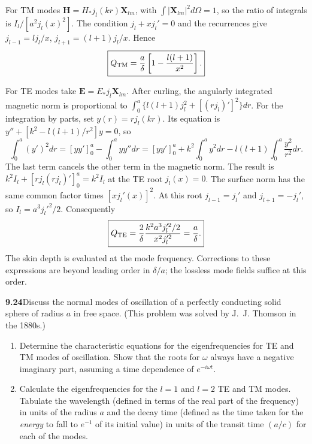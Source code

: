 For TM modes $\mathbf H=H_*j_l(kr)\mathbf X_{lm}$, with
$\int|\mathbf X_{lm}|^2d\Omega=1$, so the ratio of integrals is
$I_l/[a^2j_l(x)^2]$. The condition $j_l+xj_l'=0$ and the recurrences give
$j_{l-1}=lj_l/x$, $j_{l+1}=(l+1)j_l/x$. Hence
\[
\boxed{Q_{\rm TM}=\frac a\delta
\left[1-\frac{l(l+1)}{x^2}\right].}
\]

For TE modes take $\mathbf E=E_*j_l\mathbf X_{lm}$.
After curling, the angularly integrated magnetic norm is proportional to
$\int_0^a\{l(l+1)j_l^2+[(rj_l)']^2\}dr$.
For the integration by parts, set $y(r)=rj_l(kr)$. Its equation is
$y''+[k^2-l(l+1)/r^2]y=0$, so
\[
\int_0^a(y')^2dr=[yy']_0^a-\int_0^a yy''dr
=[yy']_0^a+k^2\int_0^a y^2dr
-l(l+1)\int_0^a\frac{y^2}{r^2}dr.
\]
The last term cancels the other term in the magnetic norm. The result is
$k^2I_l+[rj_l(rj_l)']_0^a=k^2I_l$ at the TE root $j_l(x)=0$.
The surface norm has the same common factor times $[xj_l'(x)]^2$.
At this root $j_{l-1}=j_l'$ and $j_{l+1}=-j_l'$, so
$I_l=a^3j_l'^2/2$. Consequently
\[
\boxed{Q_{\rm TE}=\frac2\delta
\frac{k^2a^3j_l'^2/2}{x^2j_l'^2}=\frac a\delta.}
\]
The skin depth is evaluated at the mode frequency. Corrections to these
expressions are beyond leading order in $\delta/a$; the lossless mode
fields suffice at this order.

\par\bigskip
\noindent\textbf{9.24}\quad Discuss the normal modes of oscillation of a perfectly conducting solid sphere of radius $a$ in free space. (This problem was solved by J.~J. Thomson in the 1880s.)
\begin{enumerate}
\item[(a)] Determine the characteristic equations for the eigenfrequencies for TE and TM modes of oscillation. Show that the roots for $\omega$ always have a negative imaginary part, assuming a time dependence of $e^{-i\omega t}$.
\item[(b)] Calculate the eigenfrequencies for the $l=1$ and $l=2$ TE and TM modes. Tabulate the wavelength (defined in terms of the real part of the frequency) in units of the radius $a$ and the decay time (defined as the time taken for the \emph{energy} to fall to $e^{-1}$ of its initial value) in units of the transit time $(a/c)$ for each of the modes.
\end{enumerate}
\solution

